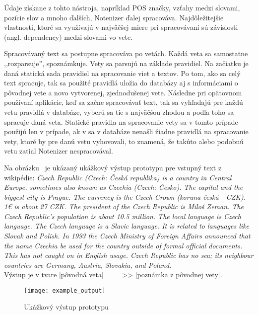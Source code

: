 Údaje získane z tohto nástroja, napríklad POS značky, vzťahy medzi slovami, pozície slov a mnoho ďalších, Notenizer ďalej spracováva. Najdôležitejšie vlastnosti, ktoré sa využívajú v najväčšej miere pri spracovávaní sú závislosti (angl. dependency) medzi slovami vo vete.  

Spracovávaný text sa postupne spracováva po vetách. Každá veta sa samostatne ,,rozparsuje'', spoznámkuje. Vety sa parsujú na základe pravidiel. Na začiatku je daná statická sada pravidiel na spracovanie viet a textov. Po tom, ako sa celý text spracuje, tak sa použité pravidlá uložia do databázy aj s informáciami o pôvodnej vete a novo vytvorenej, zjednodušenej vete. Následne pri opätovnom používaní aplikácie, keď sa začne spracovávať text, tak sa vyhľadajú pre každú vetu pravidlá v databáze, vyberú sa tie s najväčšou zhodou a podľa toho sa spracuje daná veta. Statické pravidla na spracovanie vety sa v tomto prípade použijú len v prípade, ak v sa v databáze nenašli žiadne pravidlá na spracovanie vety, ktoré by pre danú vetu vyhovovali, to znamená, že takúto alebo podobnú vetu zatiaľ Notenizer nespracovával.

Na obrázku~ je ukázaný ukážkový výstup prototypu pre vstupný text z wikipédie:
\textit{Czech Republic (Czech: Česká republika) is a country in Central Europe, sometimes also known as Czechia (Czech: Česko). The capital and the biggest city is Prague. The currency is the Czech Crown (koruna česká - CZK). 1€ is about 27 CZK. The president of the Czech Republic is Miloš Zeman. The Czech Republic's population is about 10.5 million. The local language is Czech language. The Czech language is a Slavic language. It is related to languages like Slovak and Polish. In 1993 the Czech Ministry of Foreign Affairs announced that the name Czechia be used for the country outside of formal official documents. This has not caught on in English usage. Czech Republic has no sea; its neighbour countries are Germany, Austria, Slovakia, and Poland.}
\\

Výstup je v tvare [pôvodná veta] ===>> [poznámka z pôvodnej vety].

\begin{figure}[H]
\begin{center}\texttt{[image: example\_output]}\end{center}
\caption[Ukážkový výstup prototypu]{Ukážkový výstup prototypu}\label{fig:example_output}
\end{figure}

